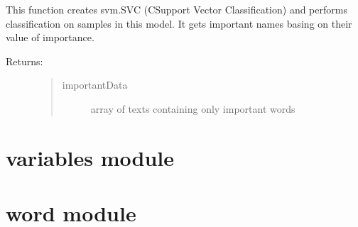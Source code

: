 \documentclass[letterpaper,10pt,english]{sphinxmanual}
\begin{document}

\begin{fulllineitems}
\label{\detokenize{svm:svm.getImportantData}}
\pysigstartsignatures
{}
\pysigstopsignatures
\sphinxAtStartPar
This function creates svm.SVC (C\sphinxhyphen{}Support Vector Classification) and performs classification on samples in this model.
It gets important names basing on their value of importance.
\begin{description}
\item[{Returns:}] \leavevmode\begin{quote}\begin{description}
\item[{importantData}] \leavevmode
\sphinxAtStartPar
array of texts containing only important words

\end{description}\end{quote}

\end{description}

\end{fulllineitems}


\sphinxstepscope


\section{variables module}
\label{\detokenize{variables:module-variables}}\label{\detokenize{variables:variables-module}}\label{\detokenize{variables::doc}}
\sphinxstepscope


\section{word module}
\label{\detokenize{word:module-word}}\label{\detokenize{word:word-module}}\label{\detokenize{word::doc}}
\end{document}
